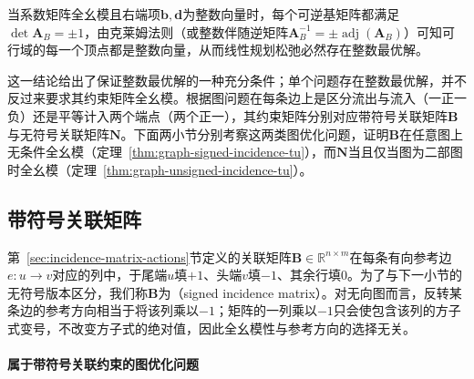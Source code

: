 当系数矩阵全幺模且右端项$\bm{b},\bm{d}$为整数向量时，每个可逆基矩阵都满足$\det\bm{A}_B=\pm1$，由克莱姆法则（或整数伴随逆矩阵$\bm{A}_B^{-1}=\pm\operatorname{adj}(\bm{A}_B)$）可知可行域的每一个顶点都是整数向量，从而线性规划松弛必然存在整数最优解。

这一结论给出了保证整数最优解的一种充分条件；单个问题存在整数最优解，并不反过来要求其约束矩阵全幺模。根据图问题在每条边上是区分流出与流入（一正一负）还是平等计入两个端点（两个正一），其约束矩阵分别对应带符号关联矩阵$\bm{B}$与无符号关联矩阵$\bm{N}$。下面两小节分别考察这两类图优化问题，证明$\bm{B}$在任意图上无条件全幺模（定理~\ref{thm:graph-signed-incidence-tu}），而$\bm{N}$当且仅当图为二部图时全幺模（定理~\ref{thm:graph-unsigned-incidence-tu}）。

\subsection{带符号关联矩阵}
\label{sec:incidence-signed-tu}
\label{sec:incidence-integrality-applications}

第~\ref{sec:incidence-matrix-actions}节定义的关联矩阵$\bm{B}\in\mathbb{R}^{n\times m}$在每条有向参考边$e\colon u\to v$对应的列中，于尾端$u$填$+1$、头端$v$填$-1$、其余行填$0$。为了与下一小节的无符号版本区分，我们称$\bm{B}$为（signed incidence matrix）。对无向图而言，反转某条边的参考方向相当于将该列乘以$-1$；矩阵的一列乘以$-1$只会使包含该列的方子式变号，不改变方子式的绝对值，因此全幺模性与参考方向的选择无关。

\paragraph{属于带符号关联约束的图优化问题}

